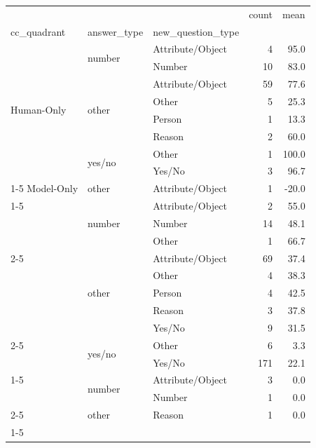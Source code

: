 \begin{tabular}{lllrr}
\toprule
 &  &  & count & mean \\
cc_quadrant & answer_type & new_question_type &  &  \\
\midrule
\multirow[t]{8}{*}{Human-Only} & \multirow[t]{2}{*}{number} & Attribute/Object & 4 & 95.0 \\
 &  & Number & 10 & 83.0 \\
\cline{2-5}
 & \multirow[t]{4}{*}{other} & Attribute/Object & 59 & 77.6 \\
 &  & Other & 5 & 25.3 \\
 &  & Person & 1 & 13.3 \\
 &  & Reason & 2 & 60.0 \\
\cline{2-5}
 & \multirow[t]{2}{*}{yes/no} & Other & 1 & 100.0 \\
 &  & Yes/No & 3 & 96.7 \\
\cline{1-5} \cline{2-5}
Model-Only & other & Attribute/Object & 1 & -20.0 \\
\cline{1-5} \cline{2-5}
\multirow[t]{10}{*}{Shared Correct} & \multirow[t]{3}{*}{number} & Attribute/Object & 2 & 55.0 \\
 &  & Number & 14 & 48.1 \\
 &  & Other & 1 & 66.7 \\
\cline{2-5}
 & \multirow[t]{5}{*}{other} & Attribute/Object & 69 & 37.4 \\
 &  & Other & 4 & 38.3 \\
 &  & Person & 4 & 42.5 \\
 &  & Reason & 3 & 37.8 \\
 &  & Yes/No & 9 & 31.5 \\
\cline{2-5}
 & \multirow[t]{2}{*}{yes/no} & Other & 6 & 3.3 \\
 &  & Yes/No & 171 & 22.1 \\
\cline{1-5} \cline{2-5}
\multirow[t]{3}{*}{Shared Wrong} & \multirow[t]{2}{*}{number} & Attribute/Object & 3 & 0.0 \\
 &  & Number & 1 & 0.0 \\
\cline{2-5}
 & other & Reason & 1 & 0.0 \\
\cline{1-5} \cline{2-5}
\bottomrule
\end{tabular}
